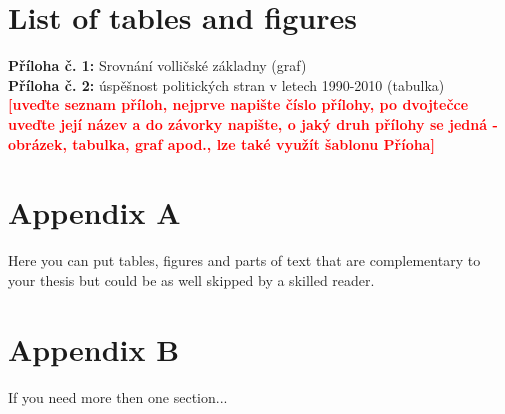 \newpage
\section*{List of tables and figures}

\noindent \textbf{Příloha č. 1:} Srovnání volličské základny (graf)\\
\noindent \textbf{Příloha č. 2:} úspěšnost politických stran v
letech
1990-2010 (tabulka)\\
\noindent \textbf{\textcolor{red}{[uveďte seznam příloh, nejprve
napište číslo přílohy, po dvojtečce uveďte její název a do závorky
napište, o jaký druh přílohy se jedná - obrázek, tabulka, graf apod.,
lze také využít šablonu Příoha]}}

\newpage
\section*{Appendix A}

Here you can put tables, figures and parts of text that are
complementary to your thesis but could be as well skipped by a
skilled reader.

\section*{Appendix B}

If you need more then one section...
